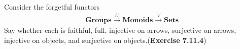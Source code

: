 Consider the forgetful functors
\begin{gather*}
    \textbf{Groups} \overset{U}{\to} \textbf{Monoids} \overset{V}{\to} \textbf{Sets}
\end{gather*}
Say whether each is faithful, full, injective on arrows, surjective on arrows, injective on objects, and surjective on objects.(\textbf{Exercise 7.11.4})